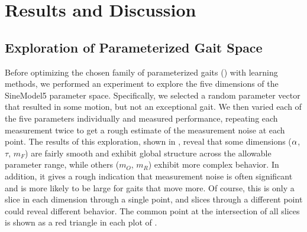 \section{Results and Discussion}




\subsection{Exploration of Parameterized Gait Space}

Before optimizing the chosen family of parameterized gaits
() with learning methods, we performed an
experiment to explore the five dimensions of the SineModel5 parameter
space. Specifically, we selected a random parameter vector that
resulted in some motion, but not an exceptional gait. We then varied
each of the five parameters individually and measured performance,
repeating each measurement twice to get a rough estimate of the
measurement noise at each point.  The results of this exploration,
shown in , reveal that some dimensions ($\alpha$,
$\tau$, $m_F$) are fairly smooth and exhibit global structure across
the allowable parameter range, while others ($m_O$, $m_R$) exhibit
more complex behavior.  In addition, it gives a rough indication that
measurement noise is often significant and is more likely to be large
for gaits that move more.  Of course, this is only a slice in each
dimension through a single point, and slices through a different point
could reveal different behavior.  The common point at the
intersection of all slices is shown as a red triangle in
each plot of .



